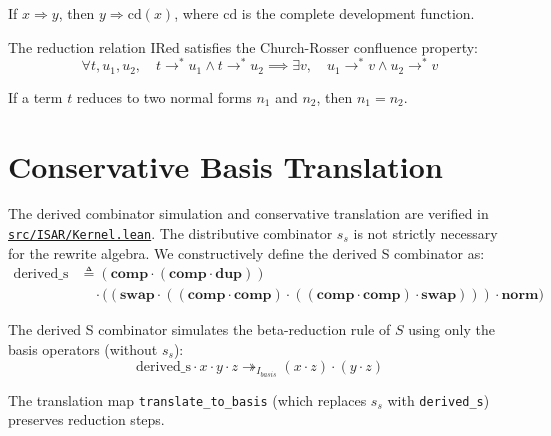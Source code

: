 \begin{theorem}
If $x \Rightarrow y$, then $y \Rightarrow \text{cd}(x)$, where $\text{cd}$ is the complete development function.
\end{theorem}

\begin{theorem}
The reduction relation $\text{IRed}$ satisfies the Church-Rosser confluence property:
$$\forall t, u_1, u_2, \quad t \to^* u_1 \land t \to^* u_2 \implies \exists v, \quad u_1 \to^* v \land u_2 \to^* v$$
\end{theorem}

\begin{theorem}
If a term $t$ reduces to two normal forms $n_1$ and $n_2$, then $n_1 = n_2$.
\end{theorem}

\section{Conservative Basis Translation}

The derived combinator simulation and conservative translation are verified in \href{https://github.com/cypoe/isar-proofs/blob/master/src/ISAR/Kernel.lean}{\texttt{src/ISAR/Kernel.lean}}. The distributive combinator $s_s$ is not strictly necessary for the rewrite algebra. We constructively define the derived S combinator as:
\begin{align*}
\text{derived\_s} &\triangleq (\mathbf{comp} \cdot (\mathbf{comp} \cdot \mathbf{dup})) \\
&\quad \cdot \big((\mathbf{swap} \cdot ((\mathbf{comp} \cdot \mathbf{comp}) \cdot ((\mathbf{comp} \cdot \mathbf{comp}) \cdot \mathbf{swap}))) \cdot \mathbf{norm}\big)
\end{align*}

\begin{theorem}
The derived S combinator simulates the beta-reduction rule of $S$ using only the basis operators (without $s_s$):
$$\text{derived\_s} \cdot x \cdot y \cdot z \twoheadrightarrow_{I_{basis}} (x \cdot z) \cdot (y \cdot z)$$
\end{theorem}

\begin{theorem}
The translation map \texttt{translate\_to\_basis} (which replaces $s_s$ with \texttt{derived\_s}) preserves reduction steps.
\end{theorem}

